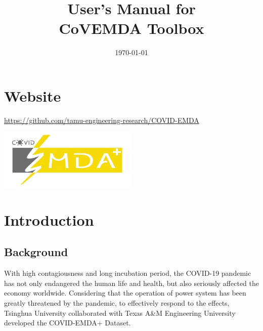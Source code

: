 \documentclass[10pt]{article}
\title{User's Manual for\\\textbf{CoVEMDA Toolbox}}
\author{}
\date{\today}
\numberwithin{equation}{section}
\numberwithin{table}{section}
\numberwithin{figure}{section}
\begin{document}
\makeatletter
\makeatother
\thispagestyle{empty}
\newpage
\tableofcontents
\thispagestyle{empty}


\newpage
\setcounter{page}{1}
\section*{Website}

\url{https://github.com/tamu-engineering-research/COVID-EMDA}

\begin{center}
	\noindent\includegraphics[width=0.5\textwidth]{figures/covid_emda_logo.JPG}
\end{center}



\newpage
\section{Introduction} \label{sec:intro}

\subsection{Background}

With high contagiousness and long incubation period, the COVID-19 pandemic has not only endangered the human life and health, but also seriously affected the economy worldwide. Considering that the operation of power system has been greatly threatened by the pandemic, to effectively respond to the effects, Tsinghua University collaborated with Texas A\&M Engineering University developed the COVID-EMDA+ Dataset.
\end{document}
